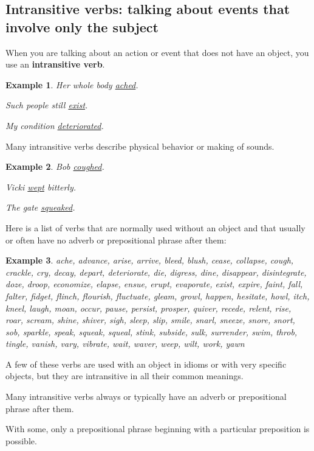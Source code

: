 \documentclass[oneside]{book}
\numberwithin{equation}{section}
\newtheorem{example}{Example}[section]
\begin{document}
\subsection{Intransitive verbs: talking about events that involve only the subject}
\noindent{} When you are talking about an action or event that does not have an object, you use an \textbf{intransitive verb}.
\begin{example}
    Her whole body \underline{ached}.
    
    Such people still \underline{exist}.
    
    My condition \underline{deteriorated}.
\end{example}
Many intransitive verbs describe physical behavior or making of sounds.
\begin{example}
    Bob \underline{coughed}.
    
    Vicki \underline{wept} bitterly.
    
    The gate \underline{squeaked}.
\end{example}
%
\noindent{} Here is a list of verbs that are normally used without an object and that usually or often have no adverb or prepositional phrase after them:
\begin{example}
    ache, advance, arise, arrive, bleed, blush, cease, collapse, cough, crackle, cry, decay, depart, deteriorate, die, digress, dine, disappear, disintegrate, doze, droop, economize, elapse, ensue, erupt, evaporate, exist, expire, faint, fall, falter, fidget, flinch, flourish, fluctuate, gleam, growl, happen, hesitate, howl, itch, kneel, laugh, moan, occur, pause, persist, prosper, quiver, recede, relent, rise, roar, scream, shine, shiver, sigh, sleep, slip, smile, snarl, sneeze, snore, snort, sob, sparkle, speak, squeak, squeal, stink, subside, sulk, surrender, swim, throb, tingle, vanish, vary, vibrate, wait, waver, weep, wilt, work, yawn
\end{example}
A few of these verbs are used with an object in idioms or with very specific objects, but they are intransitive in all their common meanings.

%
\noindent{} Many intransitive verbs always or typically have an adverb or prepositional phrase after them.

With some, only a prepositional phrase beginning with a particular preposition is possible.
\end{document}
